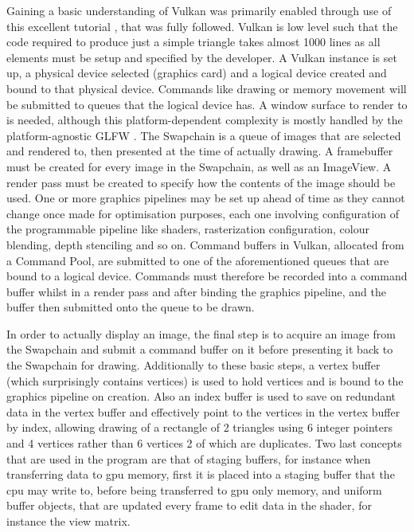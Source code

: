 \documentclass[titlepage]{article}
\begin{document}
	Gaining a basic understanding of Vulkan was primarily enabled through use of this excellent tutorial \cite{Overvoorde}, that was fully followed. Vulkan is low level such that the code required to produce just a simple triangle takes almost 1000 lines as all elements must be setup and specified by the developer. A Vulkan instance is set up, a physical device selected (graphics card) and a logical device created and bound to that physical device. Commands like drawing or memory movement will be submitted to queues that the logical device has. A window surface to render to is needed, although this platform-dependent complexity is mostly handled by the platform-agnostic GLFW \cite{GLFW}. The Swapchain is a queue of images that are selected and rendered to, then presented at the time of actually drawing. A framebuffer must be created for every image in the Swapchain, as well as an ImageView. A render pass must be created to specify how the contents of the image should be used. One or more graphics pipelines may be set up ahead of time as they cannot change once made for optimisation purposes, each one involving configuration of the programmable pipeline like shaders, rasterization configuration, colour blending, depth stenciling and so on. Command buffers in Vulkan, allocated from a Command Pool, are submitted to one of the aforementioned queues that are bound to a logical device. Commands must therefore be recorded into a command buffer whilst in a render pass and after binding the graphics pipeline, and the buffer then submitted onto the queue to be drawn.

	In order to actually display an image, the final step is to acquire an image from the Swapchain and submit a command buffer on it before presenting it back to the Swapchain for drawing. Additionally to these basic steps, a vertex buffer (which surprisingly contains vertices) is used to hold vertices and is bound to the graphics pipeline on creation. Also an index buffer is used to save on redundant data in the vertex buffer and effectively point to the vertices in the vertex buffer by index, allowing drawing of a rectangle of 2 triangles using 6 integer pointers and 4 vertices rather than 6 vertices 2 of which are duplicates. Two last concepts that are used in the program are that of staging buffers, for instance when transferring data to gpu memory, first it is placed into a staging buffer that the cpu may write to, before being transferred to gpu only memory, and uniform buffer objects, that are updated every frame to edit data in the shader, for instance the view matrix.
	
\end{document}
